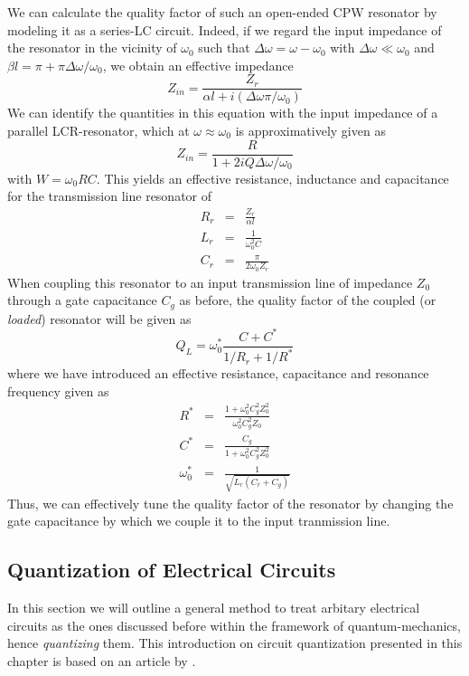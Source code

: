 We can calculate the quality factor of such an open-ended CPW resonator by modeling it as a series-LC circuit. Indeed,  if we regard the input impedance of the resonator in the vicinity of $\omega_0$ such that $\Delta \omega = \omega -\omega_0$ with $\Delta \omega \ll \omega_0$ and $\beta l = \pi +\pi\Delta \omega /\omega_0$, we obtain an effective impedance
%
\begin{equation}
Z_{in} = \frac{Z_{r}}{\alpha l + i(\Delta \omega \pi / \omega_0)}
\end{equation}
%
We can identify the quantities in this equation with the input impedance of a parallel LCR-resonator, which at $\omega\approx \omega_0$ is approximatively given as
%
\begin{equation}
Z_{in} = \frac{R}{1+2i Q \Delta \omega / \omega_0}
\end{equation}
%
with $W=\omega_0 RC$. This yields an effective resistance, inductance and capacitance for the transmission line resonator of
%
\begin{eqnarray}
R_{r} & = & \frac{Z_r}{\alpha l} \\
L_{r} & = & \frac{1}{\omega_0^2 C} \\
C_{r} & = & \frac{\pi}{2\omega_0 Z_r}
\end{eqnarray}
%
When coupling this resonator to an input transmission line of impedance $Z_0$ through a gate capacitance $C_g$ as before, the quality factor of the coupled (or {\it loaded}) resonator will be given as \citep{goppl_coplanar_2008}
%
\begin{equation}
Q_L = \omega_0^* \frac{C+C^*}{1/R_{r}+1/R^*}
\end{equation}
%
where we have introduced an effective resistance, capacitance and resonance frequency given as
%
\begin{eqnarray}
R^* & = & \frac{1+\omega_0^2 C_g^2 Z_0^2}{\omega_0^2 C_g^2 Z_0} \\
C^* & = & \frac{C_g}{1+\omega_0^2 C_g^2 Z_0^2} \\
\omega_0^* & = & \frac{1}{\sqrt{L_r(C_r+C_g)}}
\end{eqnarray}
%
Thus, we can effectively tune the quality factor of the resonator by changing the gate capacitance by which we couple it to the input tranmission line. 

\subsection{Quantization of Electrical Circuits}

In this section we will outline a general method to treat arbitary electrical circuits as the ones discussed before within the framework of quantum-mechanics, hence {\it quantizing} them. This introduction on circuit quantization presented in this chapter is based on an article by \cite{devoret_quantum_1995}.

